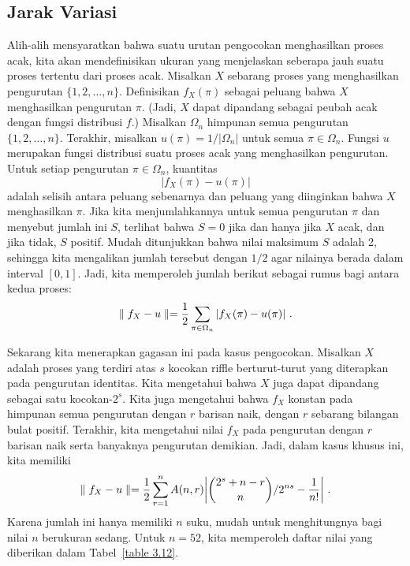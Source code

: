 \subsection*{Jarak Variasi}
Alih-alih mensyaratkan bahwa suatu urutan pengocokan menghasilkan proses acak, kita akan
mendefinisikan ukuran yang menjelaskan seberapa jauh suatu proses tertentu dari proses
acak.  Misalkan $X$ sebarang proses yang menghasilkan pengurutan $\{1, 2, \ldots, n\}$.
Definisikan $f_X(\pi)$ sebagai peluang bahwa $X$ menghasilkan pengurutan $\pi$.
(Jadi, $X$ dapat dipandang sebagai peubah acak dengan fungsi distribusi $f$.)  Misalkan
$\Omega_n$ himpunan semua pengurutan $\{1, 2, \ldots, n\}$.  Terakhir, misalkan
$u(\pi) = 1/|\Omega_n|$ untuk semua $\pi \in \Omega_n$.  Fungsi $u$ merupakan fungsi
distribusi suatu proses acak yang menghasilkan pengurutan.  Untuk setiap pengurutan
$\pi \in \Omega_n$, kuantitas
$$|f_X(\pi) - u(\pi)|$$ adalah selisih antara peluang sebenarnya dan peluang yang
diinginkan bahwa $X$ menghasilkan $\pi$.  Jika kita menjumlahkannya untuk semua pengurutan
$\pi$ dan menyebut jumlah ini $S$, terlihat bahwa $S = 0$ jika dan hanya jika $X$ acak,
dan jika tidak, $S$ positif.  Mudah ditunjukkan bahwa nilai maksimum $S$ adalah 2, sehingga
kita mengalikan jumlah tersebut dengan $1/2$ agar nilainya berada dalam interval $[0, 1]$.
Jadi, kita memperoleh jumlah berikut sebagai rumus bagi 
antara kedua proses:
$$\parallel f_X - u \parallel = {1\over 2}\sum_{\pi \in \Omega_n} |f_X(\pi) - u(\pi)|\
.$$
\par Sekarang kita menerapkan gagasan ini pada kasus pengocokan.  Misalkan $X$ adalah
proses yang terdiri atas $s$ kocokan riffle berturut-turut yang diterapkan pada
pengurutan identitas.  Kita mengetahui bahwa $X$ juga dapat dipandang sebagai satu
kocokan-$2^s$.  Kita juga mengetahui bahwa $f_X$ konstan pada himpunan semua pengurutan
dengan $r$ barisan naik, dengan $r$ sebarang bilangan bulat positif.  Terakhir, kita
mengetahui nilai $f_X$ pada pengurutan dengan $r$ barisan naik serta banyaknya pengurutan
demikian.  Jadi, dalam kasus khusus ini, kita memiliki
$$\parallel f_X - u \parallel = {1\over 2}\sum_{r=1}^n A(n, r) 
\biggl|{{2^s + n - r}\choose{n}}/2^{ns} - {1\over{n!}}\biggr|\ .$$ Karena jumlah ini
hanya memiliki $n$ suku, mudah untuk menghitungnya bagi nilai $n$ berukuran sedang.
Untuk $n = 52$, kita memperoleh daftar nilai yang diberikan dalam
Tabel~\ref{table 3.12}.

